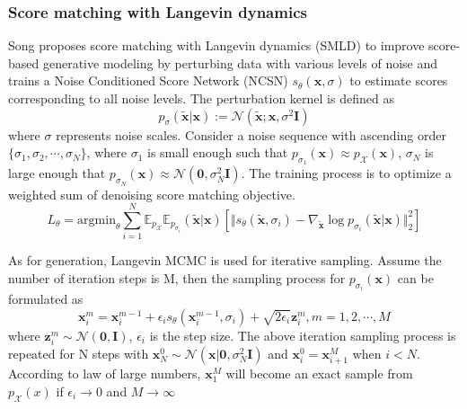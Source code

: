 \subsubsection{Score matching with Langevin dynamics}
Song \cite{song2019generative} proposes score matching with Langevin dynamics (SMLD) to improve score-based generative modeling by perturbing data with various levels of noise and trains a  Noise Conditioned Score Network (NCSN) $s_{\theta}(\textbf{x}, \sigma)$ to estimate scores corresponding to all noise levels. The perturbation kernel is defined as 
\begin{equation}\label{SMLD_D}
	p_{\sigma}(\tilde{\textbf{x}}|\textbf{x}):=\mathcal{N}(\tilde{\textbf{x}}; \textbf{x}, \sigma^2\textbf{I})
\end{equation}
where $\sigma$ represents noise scales. Consider a noise sequence with ascending order $\{\sigma_1, \sigma_2, \cdots, \sigma_N\}$, where $\sigma_1$ is small enough such that $p_{\sigma_1}(\textbf{x})\approx p_{\mathcal{X}}(\textbf{x})$, $\sigma_N$ is large enough that $p_{\sigma_N}(\textbf{x})\approx \mathcal{N}(\textbf{0}, \sigma^2_N\textbf{I})$. The training process is to optimize a weighted sum of denoising score matching \cite{vincent2011connection} objective.
\begin{equation}\label{smld_loss}
	L_{\theta}= \text{argmin}_{\theta}\sum^N_{i=1}\mathbb{E}_{p_{\mathcal{X}}}\mathbb{E}_{p_{\sigma_i}}(\tilde{\textbf{x}}|\textbf{x})[\Vert s_{\theta}(\tilde{\textbf{x}}, \sigma_i)-\nabla_{\tilde{\textbf{x}}}\log p_{\sigma_i}(\tilde{\textbf{x}}|\textbf{x})\Vert_2^2]
\end{equation}

As for generation, Langevin MCMC is used for iterative sampling. Assume the number of iteration steps is M, then the sampling process for $p_{\sigma_i}(\textbf{x})$ can be formulated as
\begin{equation}\label{smld_sample}
	\textbf{x}_{i}^m = \textbf{x}_{i}^{m-1} + \epsilon_i s_{\theta}(\textbf{x}_i^{m-1}, \sigma_i) + \sqrt{2\epsilon_i}\textbf{z}_i^m, m=1,2,\cdots,M
\end{equation}
where $\textbf{z}_i^m\sim \mathcal{N}(\textbf{0}, \textbf{I})$, $\epsilon_i$ is the step size. The above iteration sampling process is repeated for N steps with $\textbf{x}_N^0\sim \mathcal{N}(\textbf{x}|\textbf{0}, \sigma_N^2\textbf{I})$ and $\textbf{x}_i^0=\textbf{x}_{i+1}^M$ when $i<N$. According to law of large numbers, $\textbf{x}_1^M$ will become an exact sample from $p_{\mathcal{X}}(x)$ if $\epsilon_i\rightarrow 0$ and $M\rightarrow \infty$

